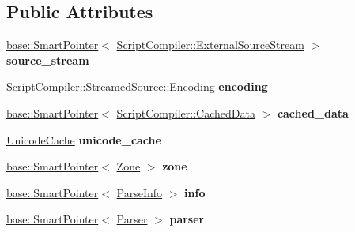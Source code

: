 \subsection*{Public Attributes}
\begin{DoxyCompactItemize}
\item 
\hyperlink{classv8_1_1base_1_1_smart_pointer}{base\+::\+Smart\+Pointer}$<$ \hyperlink{classv8_1_1_script_compiler_1_1_external_source_stream}{Script\+Compiler\+::\+External\+Source\+Stream} $>$ {\bfseries source\+\_\+stream}\hypertarget{structv8_1_1internal_1_1_streamed_source_a4189e1cb0a0cc62c468ade8ec7a98388}{}\label{structv8_1_1internal_1_1_streamed_source_a4189e1cb0a0cc62c468ade8ec7a98388}

\item 
Script\+Compiler\+::\+Streamed\+Source\+::\+Encoding {\bfseries encoding}\hypertarget{structv8_1_1internal_1_1_streamed_source_ac12fbbda5ca8fadd29b2dad202cd886a}{}\label{structv8_1_1internal_1_1_streamed_source_ac12fbbda5ca8fadd29b2dad202cd886a}

\item 
\hyperlink{classv8_1_1base_1_1_smart_pointer}{base\+::\+Smart\+Pointer}$<$ \hyperlink{structv8_1_1_script_compiler_1_1_cached_data}{Script\+Compiler\+::\+Cached\+Data} $>$ {\bfseries cached\+\_\+data}\hypertarget{structv8_1_1internal_1_1_streamed_source_a9257f7df855edf593a7c1c647cc16658}{}\label{structv8_1_1internal_1_1_streamed_source_a9257f7df855edf593a7c1c647cc16658}

\item 
\hyperlink{classv8_1_1internal_1_1_unicode_cache}{Unicode\+Cache} {\bfseries unicode\+\_\+cache}\hypertarget{structv8_1_1internal_1_1_streamed_source_a14ea553376c4980aec0fef7a4bf45926}{}\label{structv8_1_1internal_1_1_streamed_source_a14ea553376c4980aec0fef7a4bf45926}

\item 
\hyperlink{classv8_1_1base_1_1_smart_pointer}{base\+::\+Smart\+Pointer}$<$ \hyperlink{classv8_1_1internal_1_1_zone}{Zone} $>$ {\bfseries zone}\hypertarget{structv8_1_1internal_1_1_streamed_source_a393979a1332b82553ba5a17dacec1b56}{}\label{structv8_1_1internal_1_1_streamed_source_a393979a1332b82553ba5a17dacec1b56}

\item 
\hyperlink{classv8_1_1base_1_1_smart_pointer}{base\+::\+Smart\+Pointer}$<$ \hyperlink{classv8_1_1internal_1_1_parse_info}{Parse\+Info} $>$ {\bfseries info}\hypertarget{structv8_1_1internal_1_1_streamed_source_a9e0a3273c028f47c7898501aeabc5498}{}\label{structv8_1_1internal_1_1_streamed_source_a9e0a3273c028f47c7898501aeabc5498}

\item 
\hyperlink{classv8_1_1base_1_1_smart_pointer}{base\+::\+Smart\+Pointer}$<$ \hyperlink{classv8_1_1internal_1_1_parser}{Parser} $>$ {\bfseries parser}\hypertarget{structv8_1_1internal_1_1_streamed_source_a2a1d4237edb7331727fdadda18ed826f}{}\label{structv8_1_1internal_1_1_streamed_source_a2a1d4237edb7331727fdadda18ed826f}

\end{DoxyCompactItemize}
